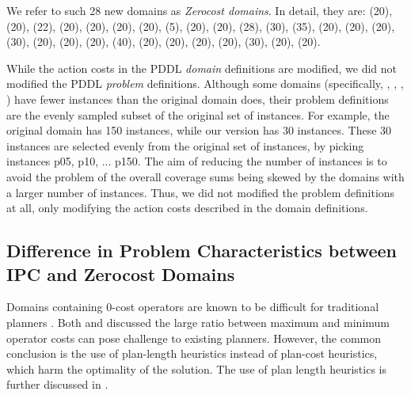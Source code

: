 We refer to such 28 new domains as \emph{Zerocost domains}.
In detail, they are:
 (20),  (20),  (22),  (20),
 (20),  (20),  (20),  (5),
 (20),  (20),  (28),  (30),
 (35),  (20),  (20),
 (20),  (30),  (20),
 (20),  (20),  (40),
 (20),  (20),  (20),
 (20),  (30),  (20),
 (20).

While the action costs in the PDDL \emph{domain} definitions are modified,
we did not modified the PDDL \emph{problem} definitions.
Although some domains (specifically, , , , ) have fewer instances than the original domain does,
their problem definitions are the evenly sampled subset of the original set of instances.
For example, the original  domain has 150 instances, while our version has 30 instances.
These 30 instances are selected evenly from the original set of instances, by picking instances p05, p10, ... p150.
% 
The aim of reducing the number of instances is to avoid the problem of the overall coverage sums being skewed by the domains with a larger number of instances.
Thus, we did not modified the problem definitions at all, only modifying the action costs described in the domain definitions.

\subsection{Difference in Problem Characteristics between IPC and Zerocost Domains}

Domains containing 0-cost operators are known to be difficult for traditional planners \cite{thayer2009using,cushing2010cost,wilt2011cost,thayer2011bounded,richter2011lama}.
Both \citeauthor{cushing2010cost} \citeyear{cushing2010cost} and \citeauthor{wilt2011cost} \citeyear{wilt2011cost} discussed the large ratio between maximum and minimum operator costs can pose challenge to existing planners. However, the common conclusion is the use of plan-length heuristics instead of plan-cost heuristics, which harm the optimality of the solution. The use of plan length heuristics is further discussed in .

